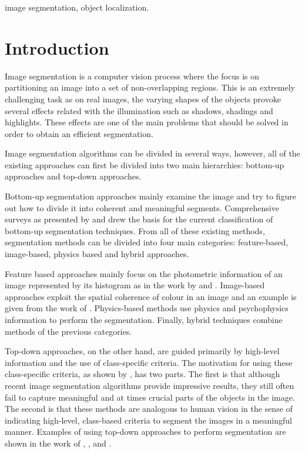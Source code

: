 \documentclass[twoside,11pt]{article}
\begin{document}
\begin{keywords}
image segmentation, object localization.
\end{keywords}

\section{Introduction}

Image segmentation is a computer vision process where the focus is on
partitioning
an image into a set of non-overlapping regions. This is an extremely challenging
task as on real images, the varying shapes of the objects provoke several
effects
related with the illumination such as shadows, shadings and highlights. These
effects
are one of the main problems that should be solved in order to obtain an
efficient
segmentation.

Image segmentation algorithms can be divided in several ways, however, all of
the
existing approaches can first be divided into two main hierarchies: bottom-up
approaches and top-down approaches.
 
Bottom-up segmentation approaches mainly examine
the image and try to figure out how to divide it into coherent and meaningful
segments. 
Comprehensive surveys as presented by \cite{Yz_colorimage} and
\cite{Cheng01colorimage} 
drew the basis for the current classification of bottom-up segmentation
techniques. 
From all of these existing methods, segmentation methods can be divided into
four 
main categories: feature-based, image-based, physics based and hybrid
approaches.

Feature based approaches mainly focus on the photometric
information of an image represented by its histogram as in the work by
\cite{1059188}
and \cite{Yang07unsupervisedsegmentation}. Image-based approaches
exploit the spatial coherence of colour in an image and an example is given
from the work of \cite{649319}.
Physics-based methods use physics and psychophysics information to perform the
segmentation. Finally, hybrid techniques combine methods of the previous
categories.

Top-down approaches, on the other hand, are guided
primarily by high-level information and the use of class-specific criteria. The
motivation
for using these class-specific criteria, as shown by \cite{649285}, has two parts.
The first is that although recent image segmentation algorithms provide
impressive
results, they still often fail to capture meaningful and at times crucial parts
of the objects in the image. The second is that these
methods are analogous to human vision in the sense of indicating high-level,
class-based criteria to segment the images in a meaningful manner. Examples of
using top-down approaches to perform segmentation are shown in the work of
\cite{649285}, \cite{Leibe04combinedobject}, \cite{1097721} and \cite{163215}.
\end{document}
